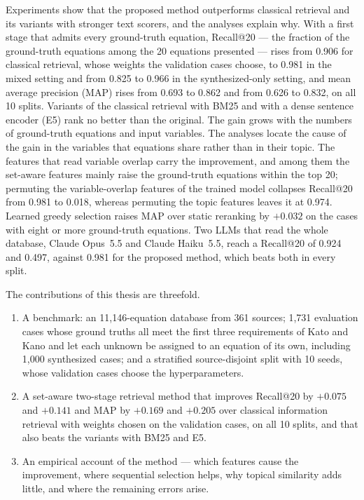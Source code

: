 Experiments show that the proposed method outperforms classical retrieval and its variants with
stronger text scorers, and the analyses explain why. With a first stage that admits every
ground-truth equation, Recall@20 --- the fraction of the ground-truth equations among the 20
equations presented --- rises from 0.906 for classical retrieval, whose weights the validation cases
choose, to 0.981 in the mixed setting and from 0.825 to 0.966 in the synthesized-only setting, and
mean average precision (MAP) rises from 0.693 to 0.862 and from 0.626 to 0.832, on all 10 splits.
Variants of the classical retrieval with BM25 and with a dense sentence encoder (E5) rank no better
than the original. The gain grows with the numbers of ground-truth equations and input variables.
The analyses locate the cause of the gain in the variables that equations share rather than in
their topic. The features that read variable overlap carry the improvement, and among them the
set-aware features mainly raise the ground-truth equations within the top 20; permuting the
variable-overlap features of the trained model collapses Recall@20 from 0.981 to 0.018, whereas
permuting the topic features leaves it at 0.974. Learned greedy selection raises MAP over static reranking by
$+0.032$ on the cases with eight or more ground-truth equations. Two LLMs that read the whole database, Claude Opus~5.5 and
Claude Haiku~5.5, reach a Recall@20 of 0.924 and 0.497, against 0.981 for the proposed method,
which beats both in every split.

The contributions of this thesis are threefold.
\begin{enumerate}
  \item A benchmark: an 11,146-equation database from 361 sources; 1,731 evaluation cases whose
    ground truths all meet the first three requirements of Kato and Kano and let each unknown be
    assigned to an equation of its own, including 1,000 synthesized cases; and a stratified
    source-disjoint split with 10 seeds, whose validation cases choose the hyperparameters.
  \item A set-aware two-stage retrieval method that improves Recall@20 by $+0.075$ and $+0.141$ and
    MAP by $+0.169$ and $+0.205$ over classical information retrieval with weights chosen on the
    validation cases, on all 10 splits, and that also beats the variants with BM25 and E5.
  \item An empirical account of the method --- which features cause the improvement, where
    sequential selection helps, why topical similarity adds little, and where the remaining errors
    arise.
\end{enumerate}

